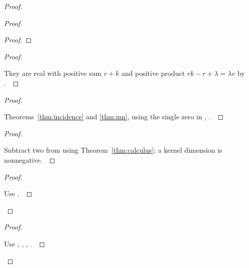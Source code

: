 \documentclass[11pt]{amsart}
\let\qed\relax
\theoremstyle{definition}
\begin{document}
\begin{proof}
\begin{proof}
\begin{proof}
\end{proof}
\begin{proof}
\pf\ \raggedright They are real with positive sum $r+k$ and positive product $rk-r+\lambda=\lambda v$ by .~\qed
\end{proof}
\begin{proof}
\pf\ \raggedright Theorems~\ref{thm:incidence} and \ref{thm:mn}, using the single zero in , .~\qed
\end{proof}
\begin{proof}
\pf\ \raggedright Subtract two from  using Theorem~\ref{thm:calculus}; a kernel dimension is nonnegative.~\qed
\end{proof}
\qedstep
\begin{proof}
\pf\ \raggedright Use .~\qed
\end{proof}
\end{proof}
\qedstep
\begin{proof}
\pf\ \raggedright Use , , , .~\qed
\end{proof}
\end{proof}
\end{document}
